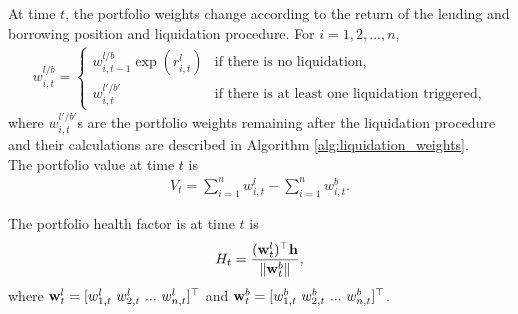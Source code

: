 \documentclass{article} %
\theoremstyle{plain}
\theoremstyle{definition} %
\begin{document}
At time $t$, the portfolio weights change according to the return of the lending and borrowing position and liquidation procedure. For $i=1,2,...,n$,
\begin{align*}
  w^{l/b}_{i,t} =\begin{cases}
     w^{l/b}_{i,t-1} \exp(r^l_{i,t})  &\text{if there is no liquidation,}\\
     w^{l'/b'}_{i,t} &\text{if there is at least one liquidation triggered,}
    \end{cases}
  \end{align*}
  where $w^{l'/b'}_{i,t}$s are the portfolio weights remaining after the liquidation procedure and their calculations are described in Algorithm \ref{alg:liquidation_weights}.\\

The portfolio value at time $t$ is
\begin{align*}
  V_t =\sum_{i=1}^n w^{l}_{i,t} - \sum_{i=1}^n w^{b}_{i,t}.
  \end{align*}

The portfolio health factor is at time $t$ is 
\begin{align*}
H_t = \frac{({\bf w}^l_t)^\top {\bf h} }{\|{\bf w}^b_t\|},
\end{align*}
where ${\bf w}^l_t =[w^{l}_{1,t}\ w^{l}_{2,t}\ ...\ w^{l}_{n,t}]^\top$ and ${\bf w}^b_t=[w^{b}_{1,t}\ w^{b}_{2,t}\ ...\ w^{b}_{n,t}]^\top$.
\end{document}
